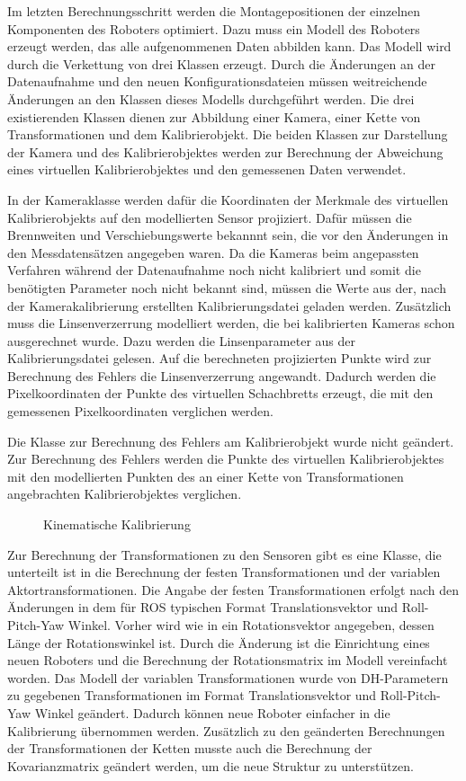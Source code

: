 Im letzten Berechnungsschritt werden die Montagepositionen der einzelnen Komponenten des 
Roboters optimiert. Dazu muss ein Modell des Roboters erzeugt werden, das 
alle aufgenommenen Daten abbilden kann. Das Modell wird durch die Verkettung
von drei Klassen erzeugt. Durch die Änderungen an der Datenaufnahme
und den neuen Konfigurationsdateien müssen weitreichende Änderungen an den 
Klassen dieses Modells durchgeführt werden. Die drei existierenden Klassen 
dienen zur Abbildung einer Kamera, einer Kette von Transformationen und
dem Kalibrierobjekt. Die beiden Klassen zur Darstellung der Kamera und des 
Kalibrierobjektes werden zur Berechnung der Abweichung eines virtuellen
Kalibrierobjektes und den gemessenen Daten verwendet.

In der Kameraklasse werden dafür die Koordinaten der Merkmale des virtuellen 
Kalibrierobjekts auf den modellierten Sensor projiziert. Dafür müssen die
Brennweiten und Verschiebungswerte bekannnt sein, die vor den Änderungen in den
Messdatensätzen angegeben waren. Da die Kameras beim angepassten Verfahren 
während der Datenaufnahme noch nicht kalibriert und somit die benötigten 
Parameter noch nicht bekannt sind, müssen die Werte aus der, nach der
Kamerakalibrierung erstellten Kalibrierungsdatei geladen werden. 
Zusätzlich muss die Linsenverzerrung modelliert werden, die bei kalibrierten 
Kameras schon ausgerechnet wurde. Dazu werden die Linsenparameter aus der 
Kalibrierungsdatei gelesen. Auf die berechneten projizierten Punkte wird zur 
Berechnung des Fehlers die Linsenverzerrung angewandt. Dadurch werden
die Pixelkoordinaten der Punkte des virtuellen Schachbretts erzeugt, die mit 
den gemessenen Pixelkoordinaten verglichen werden.

Die Klasse zur Berechnung des Fehlers am Kalibrierobjekt wurde nicht geändert.
Zur Berechnung des Fehlers werden die Punkte des virtuellen Kalibrierobjektes
mit den modellierten Punkten des an einer Kette von Transformationen angebrachten
Kalibrierobjektes verglichen.

\begin{figure}[htpb]
  \centering

    \label{fig:run_calibration}
    \caption{Kinematische Kalibrierung}
\end{figure}

Zur Berechnung der Transformationen zu den Sensoren gibt es eine Klasse, die 
unterteilt ist in die Berechnung der festen Transformationen und der variablen
Aktortransformationen. Die Angabe der festen Transformationen erfolgt nach den
Änderungen in dem für \ac{ROS} typischen Format Translationsvektor und
Roll-Pitch-Yaw Winkel. Vorher wird wie in \cite[Abschnitt 3.3.2]{pr2_estimation}
ein Rotationsvektor angegeben, dessen Länge der Rotationswinkel ist. 
Durch die Änderung ist die Einrichtung eines neuen Roboters und die Berechnung
der Rotationsmatrix im Modell vereinfacht worden. 
Das Modell der variablen Transformationen wurde von \ac{DH-Parameter}n zu
gegebenen Transformationen im Format Translationsvektor und 
Roll-Pitch-Yaw Winkel geändert. Dadurch können neue Roboter einfacher in die 
Kalibrierung übernommen werden. 
Zusätzlich zu den geänderten Berechnungen der Transformationen der Ketten musste
auch die Berechnung der Kovarianzmatrix geändert werden, um die neue Struktur zu 
unterstützen. 

